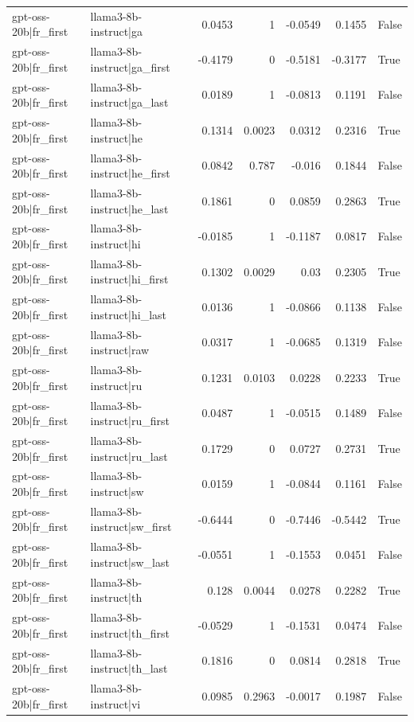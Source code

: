 \begin{table}
\begin{tabular}{l l r r r r l}
gpt-oss-20b|fr_first & llama3-8b-instruct|ga & 0.0453 & 1 & -0.0549 & 0.1455 & False \\
gpt-oss-20b|fr_first & llama3-8b-instruct|ga_first & -0.4179 & 0 & -0.5181 & -0.3177 & True \\
gpt-oss-20b|fr_first & llama3-8b-instruct|ga_last & 0.0189 & 1 & -0.0813 & 0.1191 & False \\
gpt-oss-20b|fr_first & llama3-8b-instruct|he & 0.1314 & 0.0023 & 0.0312 & 0.2316 & True \\
gpt-oss-20b|fr_first & llama3-8b-instruct|he_first & 0.0842 & 0.787 & -0.016 & 0.1844 & False \\
gpt-oss-20b|fr_first & llama3-8b-instruct|he_last & 0.1861 & 0 & 0.0859 & 0.2863 & True \\
gpt-oss-20b|fr_first & llama3-8b-instruct|hi & -0.0185 & 1 & -0.1187 & 0.0817 & False \\
gpt-oss-20b|fr_first & llama3-8b-instruct|hi_first & 0.1302 & 0.0029 & 0.03 & 0.2305 & True \\
gpt-oss-20b|fr_first & llama3-8b-instruct|hi_last & 0.0136 & 1 & -0.0866 & 0.1138 & False \\
gpt-oss-20b|fr_first & llama3-8b-instruct|raw & 0.0317 & 1 & -0.0685 & 0.1319 & False \\
gpt-oss-20b|fr_first & llama3-8b-instruct|ru & 0.1231 & 0.0103 & 0.0228 & 0.2233 & True \\
gpt-oss-20b|fr_first & llama3-8b-instruct|ru_first & 0.0487 & 1 & -0.0515 & 0.1489 & False \\
gpt-oss-20b|fr_first & llama3-8b-instruct|ru_last & 0.1729 & 0 & 0.0727 & 0.2731 & True \\
gpt-oss-20b|fr_first & llama3-8b-instruct|sw & 0.0159 & 1 & -0.0844 & 0.1161 & False \\
gpt-oss-20b|fr_first & llama3-8b-instruct|sw_first & -0.6444 & 0 & -0.7446 & -0.5442 & True \\
gpt-oss-20b|fr_first & llama3-8b-instruct|sw_last & -0.0551 & 1 & -0.1553 & 0.0451 & False \\
gpt-oss-20b|fr_first & llama3-8b-instruct|th & 0.128 & 0.0044 & 0.0278 & 0.2282 & True \\
gpt-oss-20b|fr_first & llama3-8b-instruct|th_first & -0.0529 & 1 & -0.1531 & 0.0474 & False \\
gpt-oss-20b|fr_first & llama3-8b-instruct|th_last & 0.1816 & 0 & 0.0814 & 0.2818 & True \\
gpt-oss-20b|fr_first & llama3-8b-instruct|vi & 0.0985 & 0.2963 & -0.0017 & 0.1987 & False \\

\end{tabular}
\end{table}
